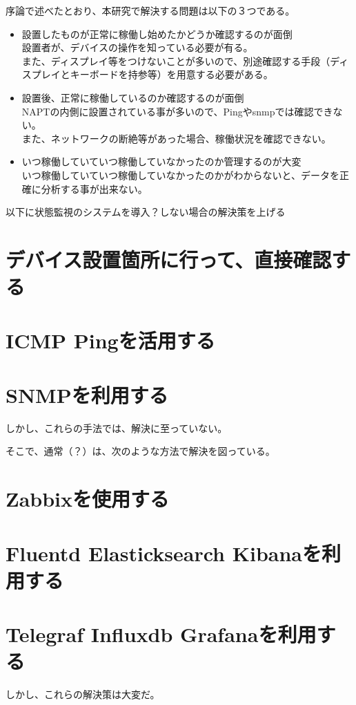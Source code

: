 序論で述べたとおり、本研究で解決する問題は以下の３つである。
\begin{itemize}
	\item 設置したものが正常に稼働し始めたかどうか確認するのが面倒\\
	設置者が、デバイスの操作を知っている必要が有る。\\
	また、ディスプレイ等をつけないことが多いので、別途確認する手段（ディスプレイとキーボードを持参等）を用意する必要がある。
	\item 設置後、正常に稼働しているのか確認するのが面倒\\
	NAPTの内側に設置されている事が多いので、Pingやsnmpでは確認できない。\\
	また、ネットワークの断絶等があった場合、稼働状況を確認できない。
	\item いつ稼働していていつ稼働していなかったのか管理するのが大変\\
	いつ稼働していていつ稼働していなかったのかがわからないと、データを正確に分析する事が出来ない。
\end{itemize}

以下に状態監視のシステムを導入？しない場合の解決策を上げる
\section{デバイス設置箇所に行って、直接確認する}
\section{ICMP Pingを活用する}
\section{SNMPを利用する}
しかし、これらの手法では、解決に至っていない。

そこで、通常（？）は、次のような方法で解決を図っている。
\section{Zabbixを使用する}
\section{Fluentd Elasticksearch Kibanaを利用する}
\section{Telegraf Influxdb Grafanaを利用する}
しかし、これらの解決策は大変だ。


